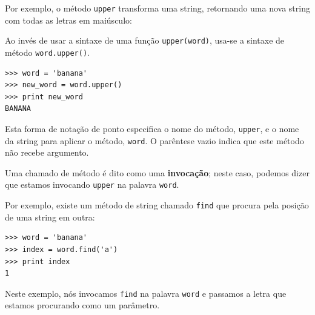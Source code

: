 {Por exemplo, o método {\tt upper} transforma uma string, retornando uma nova
string com todas as letras em maiúsculo:


Ao invés de usar a sintaxe de uma função {\tt upper(word)}, usa-se a sintaxe
de método {\tt word.upper()}.


\beforeverb
\begin{verbatim}
>>> word = 'banana'
>>> new_word = word.upper()
>>> print new_word
BANANA
\end{verbatim}
\afterverb
%
%
Esta forma de notação de ponto especifica o nome do método, {\tt upper}, e
o nome da string para aplicar o método, {\tt word}. O parêntese vazio indica
que este método não recebe argumento.



Uma chamado de método é dito como uma {\bf invocação}; neste caso, podemos
dizer que estamos invocando {\tt upper} na palavra {\tt word}.



Por exemplo, existe um método de string chamado {\tt find} que procura pela
posição de uma string em outra:

\beforeverb
\begin{verbatim}
>>> word = 'banana'
>>> index = word.find('a')
>>> print index
1
\end{verbatim}
\afterverb
%
%
Neste exemplo, nós invocamos {\tt find} na palavra {\tt word} e passamos a
letra que estamos procurando como um parâmetro.


}
